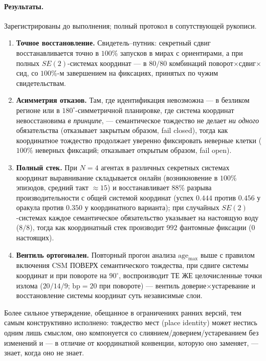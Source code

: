 \documentclass{article}
\begin{document}
\paragraph{Результаты.} Зарегистрированы до выполнения; полный
протокол в сопутствующей рукописи.
\begin{enumerate}[leftmargin=20pt,itemsep=2pt,topsep=2pt]
\item \textbf{Точное восстановление.} Свидетель--путник: секретный
  сдвиг восстанавливается точно в $100\%$ запусков в мирах с
  ориентирами, а при полных $SE(2)$-системах координат --- в $80/80$
  комбинаций поворот$\times$сдвиг$\times$сид, со $100\%$-м завершением
  на фиксациях, принятых по чужим свидетельствам.
\item \textbf{Асимметрия отказов.} Там, где идентификация невозможна
  --- в безликом регионе или в $180^\circ$-симметричной планировке,
  где система координат невосстановима \emph{в принципе}, ---
  семантическое тождество не делает \emph{ни одного} обязательства
  (отказывает закрытым образом, fail closed), тогда как координатное
  тождество продолжает уверенно фиксировать неверные клетки ($100\%$
  неверных фиксаций; отказывает открытым образом, fail open).
\item \textbf{Полный стек.} При $N{=}4$ агентах в различных секретных
  системах координат выравнивание складывается онлайн (возникновение в
  $100\%$ эпизодов, средний такт ${\approx}15$) и восстанавливает
  $88\%$ разрыва производительности с общей системой координат (успех
  $0.444$ против $0.456$ у оракула против $0.350$ у координатного
  варианта); при случайных $SE(2)$-системах каждое семантическое
  обязательство указывает на настоящую воду ($8/8$), тогда как
  координатный стек производит $992$ фантомные фиксации ($0$
  настоящих).
\item \textbf{Вентиль ортогонален.} Повторный прогон анализа
  $\mathrm{age}_{\max}$ выше с правилом включения CSM ПОВЕРХ
  семантического тождества, при сдвиге системы координат и при
  повороте на $90^\circ$, воспроизводит ТЕ ЖЕ целочисленные точки
  излома ($20/14/9$; $\mathrm{bp}=20$ при повороте) --- вентиль
  доверие$\times$устаревание и восстановление системы координат суть
  независимые слои.
\end{enumerate}

Более сильное утверждение, обещанное в ограничениях ранних версий,
тем самым конструктивно исполнено: тождество мест (place identity)
может нестись одним лишь смыслом, оно компонуется со
слиянием/доверием/устареванием без изменений и --- в отличие от
координатной конвенции, которую оно заменяет, --- знает, когда оно не
знает.
\end{document}

